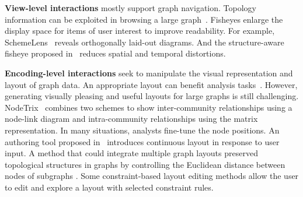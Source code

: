 \textbf{View-level interactions} mostly support graph navigation.
Topology information can be exploited in browsing a large graph~\cite{moscovich2009topology}.
Fisheyes enlarge the display space for items of user interest to improve readability.
For example,  
SchemeLens~\cite{DBLP:journals/tvcg/CoheLBEL16} reveals orthogonally laid-out diagrams.
And the structure-aware fisheye proposed in~\cite{DBLP:journals/tvcg/WangWZSFSCD19} reduces spatial and temporal distortions.


\textbf{Encoding-level interactions} seek to manipulate the visual representation and layout of graph data. 
An appropriate layout can benefit analysis tasks~\cite{jusufi2013multivariate, major2018graphicle}. However, generating visually pleasing and
useful layouts for large graphs is still challenging.
NodeTrix~\cite{henry2007nodetrix} combines two schemes to show inter-community relationships using a node-link diagram and intra-community relationships using the matrix representation. 
In many situations, analysts fine-tune the node positions.
An authoring tool proposed in~\cite{DBLP:conf/gd/DwyerMW08a} introduces continuous layout in response to user input.
A method that could integrate multiple graph layouts preserved topological structures in graphs by controlling the Euclidean distance between nodes of subgraphs \cite{yuan2012intelligent}.
Some constraint-based layout editing methods allow the user to edit and explore a layout with selected constraint rules. 

